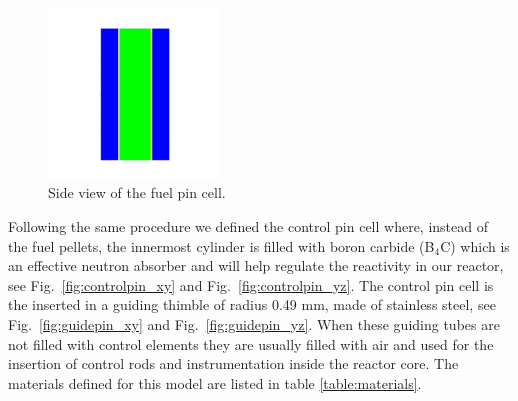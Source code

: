 \documentclass[twocolumn,a4paper,10pt]{article}
\begin{document}
\begin{figure}[ht]
  \centering
  \includegraphics[width=0.4\textwidth]{../Pictures/Fuelrods_plot_yz.png}
  \caption{Side view of the fuel pin cell.}
  \label{fig:fuelpinyz}
\end{figure}

\par
Following the same procedure we defined the control pin cell where, instead of the fuel pellets, the innermost cylinder is filled with boron carbide (B$_4$C) which is an effective neutron absorber and will help regulate the reactivity in our reactor, see Fig.~\ref{fig:controlpin_xy} and Fig.~\ref{fig:controlpin_yz}. The control pin cell is the inserted in a guiding thimble of radius 0.49 mm, made of stainless steel, see Fig.~\ref{fig:guidepin_xy} and Fig.~\ref{fig:guidepin_yz}. When these guiding tubes are not filled with control elements they are usually filled with air and used for the insertion of control rods and instrumentation inside the reactor core. The materials defined for this model are listed in table \ref{table:materials}.
\end{document}
